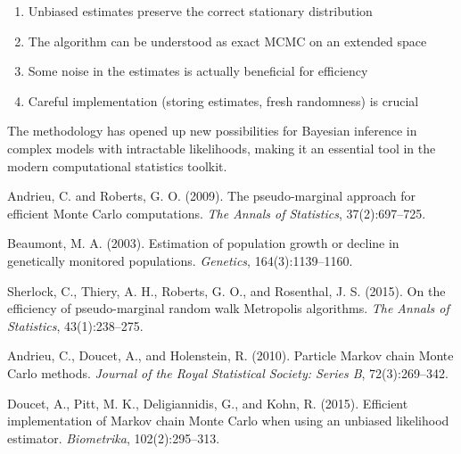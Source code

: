 \documentclass[11pt]{article}
\theoremstyle{definition}
\begin{document}
\begin{enumerate}
\item Unbiased estimates preserve the correct stationary distribution
\item The algorithm can be understood as exact MCMC on an extended space
\item Some noise in the estimates is actually beneficial for efficiency
\item Careful implementation (storing estimates, fresh randomness) is crucial
\end{enumerate}

The methodology has opened up new possibilities for Bayesian inference in complex models with intractable likelihoods, making it an essential tool in the modern computational statistics toolkit.

\begin{thebibliography}{10}

Andrieu, C. and Roberts, G. O. (2009).
\newblock The pseudo-marginal approach for efficient Monte Carlo computations.
\newblock \emph{The Annals of Statistics}, 37(2):697--725.

Beaumont, M. A. (2003).
\newblock Estimation of population growth or decline in genetically monitored populations.
\newblock \emph{Genetics}, 164(3):1139--1160.

Sherlock, C., Thiery, A. H., Roberts, G. O., and Rosenthal, J. S. (2015).
\newblock On the efficiency of pseudo-marginal random walk Metropolis algorithms.
\newblock \emph{The Annals of Statistics}, 43(1):238--275.

Andrieu, C., Doucet, A., and Holenstein, R. (2010).
\newblock Particle Markov chain Monte Carlo methods.
\newblock \emph{Journal of the Royal Statistical Society: Series B}, 72(3):269--342.

Doucet, A., Pitt, M. K., Deligiannidis, G., and Kohn, R. (2015).
\newblock Efficient implementation of Markov chain Monte Carlo when using an unbiased likelihood estimator.
\newblock \emph{Biometrika}, 102(2):295--313.

\end{thebibliography}
\end{document}
